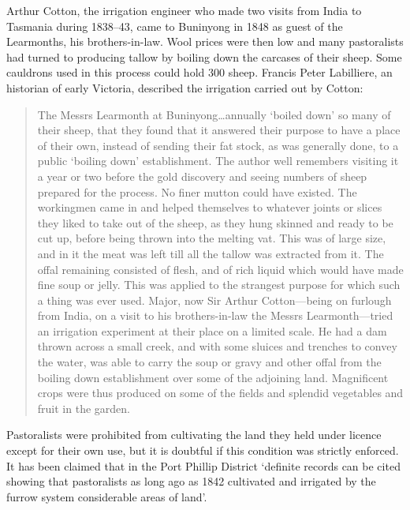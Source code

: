 Arthur Cotton, the irrigation engineer who made two visits from India
to Tasmania during 1838--43, came to Buninyong in 1848 as guest of the
Learmonths, his brothers-in-law.  Wool prices were then low and many
pastoralists had turned to producing tallow by boiling down the
carcases of their sheep.  Some cauldrons used in this process could
hold 300 sheep.  Francis Peter
Labilliere, an historian of early Victoria, described the irrigation
carried out by Cotton:
\begin{quote}
	The Messrs Learmonth at Buninyong\ldots annually `boiled down'
	so many of their sheep, that they found that it answered their
	purpose to have a place of their own, instead of sending their
	fat stock, as was generally done, to a public `boiling down'
	establishment.  The author well remembers visiting it a year
	or two before the gold discovery and seeing numbers of sheep
	prepared for the process.  No finer mutton could have existed.
	The workingmen came in and helped themselves to whatever
	joints or slices they liked to take out of the sheep, as they
	hung skinned and ready to be cut up, before being thrown into
	the melting vat.  This was of large size, and in it the meat
	was left till all the tallow was extracted from it.  The offal
	remaining consisted of flesh, and of rich liquid which would
	have made fine soup or jelly.  This was applied to the
	strangest purpose for which such a thing was ever used.
	Major, now Sir Arthur Cotton---being on furlough from India,
	on a visit to his brothers-in-law the Messrs Learmonth---tried
	an irrigation experiment at their place on a limited scale.
	He had a dam thrown across a small creek, and with some
	sluices and trenches to convey the water, was able to carry
	the soup or gravy and other offal from the boiling down
	establishment over some of the adjoining land.  Magnificent
	crops were thus produced on some of the fields and splendid
	vegetables and fruit in the
	garden.
\end{quote}

Pastoralists were prohibited from cultivating the land they held under
licence except for their own use, but it is doubtful if this condition
was strictly enforced.  It has been claimed that in the Port Phillip
District `definite records can be cited showing that pastoralists as
long ago as 1842 cultivated and irrigated by the furrow system
considerable areas of land'.

